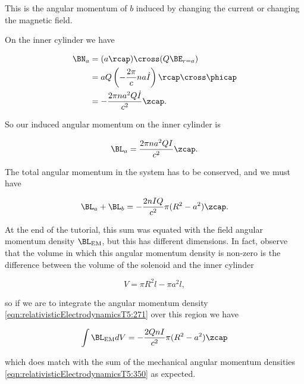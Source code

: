 This is the angular momentum of $b$ induced by changing the current or changing the magnetic field.

On the inner cylinder we have

\begin{align*}
\BN_a
&= (a \rcap ) \cross (Q \BE_{r = a}) \\
&= a Q \left(- \frac{2 \pi}{c} n a \dot{I} \right) \rcap \cross \phicap \\
&= -\frac{2 \pi n a^2 Q \dot{I}}{c^2} \zcap.
\end{align*}

So our induced angular momentum on the inner cylinder is

\begin{equation}\label{eqn:relativisticElectrodynamicsT5:330}
\BL_a = \frac{2 \pi n a^2 Q I}{c^2} \zcap.
\end{equation}

The total angular momentum in the system has to be conserved, and we must have

\begin{equation}\label{eqn:relativisticElectrodynamicsT5:350}
\BL_a + \BL_b = -\frac{2 n I Q}{c^2} \pi (R^2 - a^2) \zcap.
\end{equation}

At the end of the tutorial, this sum was equated with the field angular momentum density $\BL_{\text{EM}}$, but this has different dimensions.  In fact, observe that the volume in which this angular momentum density is non-zero is the difference between the volume of the solenoid and the inner cylinder

\begin{equation}\label{eqn:relativisticElectrodynamicsT5:351}
V = \pi R^2 l - \pi a^2 l,
\end{equation}

so if we are to integrate the angular momentum density \ref{eqn:relativisticElectrodynamicsT5:271} over this region we have

\begin{equation}\label{eqn:relativisticElectrodynamicsT5:271b}
\int \BL_{\text{EM}} dV = -\frac{2 Q n I}{c^2} \pi (R^2 - a^2) \zcap
\end{equation}

which does match with the sum of the mechanical angular momentum densities \ref{eqn:relativisticElectrodynamicsT5:350} as expected.

\EndArticle
